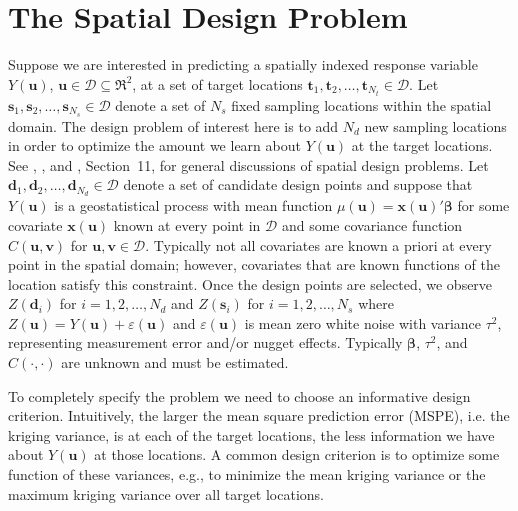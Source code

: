 \documentclass[cmbright]{staauth}
\begin{document}
\section{The Spatial Design Problem}\label{sec:spatialdesign}
Suppose we are interested in predicting a spatially indexed response variable $Y(\bm{u})$, $\bm{u}\in \mathcal{D}\subseteq \Re^2$, at a set of target locations $\bm{t}_1, \bm{t}_2, \dots, \bm{t}_{N_t}\in\mathcal{D}$. Let $\bm{s}_1, \bm{s}_2, \dots, \bm{s}_{N_s}\in\mathcal{D}$ denote a set of $N_s$ fixed sampling locations within the spatial domain. The design problem of interest here is to add $N_d$ new sampling locations in order to optimize the amount we learn about $Y(\bm{u})$ at the target locations. See \cite{muller2007collecting}, \cite{mateu2012spatio}, and \cite{le2006statistical}, Section~11, for general discussions of spatial design problems. Let $\bm{d}_1, \bm{d}_2, \dots, \bm{d}_{N_d}\in\mathcal{D}$ denote a set of candidate design points and suppose that $Y(\bm{u})$ is a geostatistical process with mean function $\mu(\bm{u})=\bm{x}(\bm{u})'\bm{\beta}$ for some covariate $\bm{x}(\bm{u})$ known at every point in $\mathcal{D}$ and some covariance function $C(\bm{u}, \bm{v})$ for $\bm{u},\bm{v}\in\mathcal{D}$. Typically not all covariates are known a priori at every point in the spatial domain; however, covariates that are known functions of the location satisfy this constraint. Once the design points are selected, we observe $Z(\bm{d}_i)$ for $i=1,2,\dots,N_d$ and $Z(\bm{s}_i)$ for $i=1,2,\dots,N_s$ where $Z(\bm{u}) = Y(\bm{u}) + \varepsilon(\bm{u})$ and $\varepsilon(\bm{u})$ is mean zero white noise with variance $\tau^2$, representing measurement error and/or nugget effects. Typically $\bm{\beta}$, $\tau^2$, and $C(\cdot,\cdot)$ are unknown and must be estimated.

To completely specify the problem we need to choose an informative design criterion. Intuitively, the larger the mean square prediction error (MSPE), i.e. the kriging variance, is at each of the target locations, the less information we have about $Y(\bm{u})$ at those locations. A common design criterion is to optimize some function of these variances, e.g., to minimize the mean kriging variance or the maximum kriging variance over all target locations. 
\end{document}
